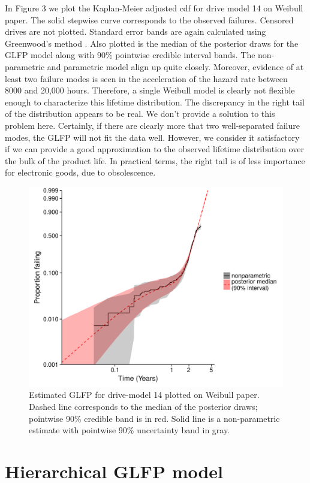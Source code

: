 \documentclass[12pt]{article}
\begin{document}
In Figure 3 we plot the Kaplan-Meier adjusted cdf for drive model 14 on Weibull paper.  The solid stepwise curve corresponds to the observed failures.  Censored drives are not plotted.  Standard error bands are again calculated using Greenwood's method \cite{green}.  Also plotted is the median of the posterior draws for the GLFP model along with 90\% pointwise credible interval bands.  The non-parametric and parametric model align up quite closely.  Moreover, evidence of at least two failure modes is seen in the acceleration of the hazard rate between 8000 and 20,000 hours.  Therefore, a single Weibull model is clearly not flexible enough to characterize this lifetime distribution. The discrepancy in the right tail of the distribution appears to be real. We don't provide a solution to this problem here. Certainly, if there are clearly more that two well-separated failure modes, the GLFP will not fit the data well. However, we consider it satisfactory if we can provide a good approximation to the observed lifetime distribution over the bulk of the product life. In practical terms, the right tail is of less importance for electronic goods, due to obsolescence.

\begin{figure}[H]
\centering
  \includegraphics[width=.8\textwidth]{mod14_example1.pdf}
  \caption{Estimated GLFP for drive-model 14 plotted on Weibull paper.  Dashed line corresponds to the median of the posterior draws; pointwise 90\% credible band is in red.  Solid line is a non-parametric estimate with pointwise 90\% uncertainty band in gray.}
  \label{fig1}
\end{figure}


\section{Hierarchical GLFP model}
\label{sec:Hierarchical GLFP model}
\end{document}
